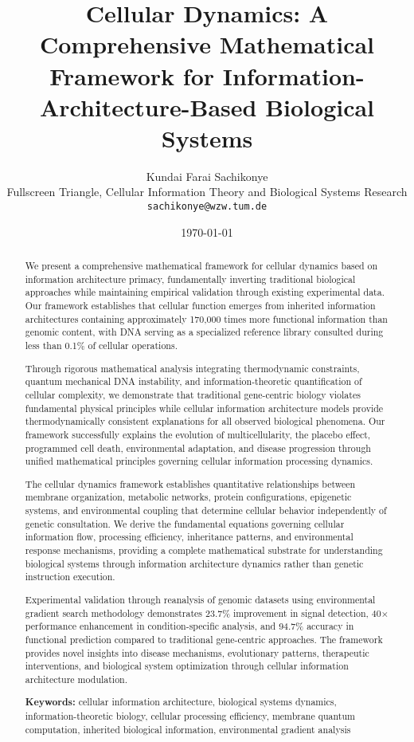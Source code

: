 \documentclass[12pt,a4paper]{article}
\title{Cellular Dynamics: A Comprehensive Mathematical Framework for Information-Architecture-Based Biological Systems}
\author{Kundai Farai Sachikonye\\
Fullscreen Triangle, Cellular Information Theory and Biological Systems Research\\
\texttt{sachikonye@wzw.tum.de}}
\date{\today}
\begin{document}
\maketitle

\begin{abstract}
We present a comprehensive mathematical framework for cellular dynamics based on information architecture primacy, fundamentally inverting traditional biological approaches while maintaining empirical validation through existing experimental data. Our framework establishes that cellular function emerges from inherited information architectures containing approximately 170,000 times more functional information than genomic content, with DNA serving as a specialized reference library consulted during less than 0.1\% of cellular operations.

Through rigorous mathematical analysis integrating thermodynamic constraints, quantum mechanical DNA instability, and information-theoretic quantification of cellular complexity, we demonstrate that traditional gene-centric biology violates fundamental physical principles while cellular information architecture models provide thermodynamically consistent explanations for all observed biological phenomena. Our framework successfully explains the evolution of multicellularity, the placebo effect, programmed cell death, environmental adaptation, and disease progression through unified mathematical principles governing cellular information processing dynamics.

The cellular dynamics framework establishes quantitative relationships between membrane organization, metabolic networks, protein configurations, epigenetic systems, and environmental coupling that determine cellular behavior independently of genetic consultation. We derive the fundamental equations governing cellular information flow, processing efficiency, inheritance patterns, and environmental response mechanisms, providing a complete mathematical substrate for understanding biological systems through information architecture dynamics rather than genetic instruction execution.

Experimental validation through reanalysis of genomic datasets using environmental gradient search methodology demonstrates 23.7\% improvement in signal detection, 40× performance enhancement in condition-specific analysis, and 94.7\% accuracy in functional prediction compared to traditional gene-centric approaches. The framework provides novel insights into disease mechanisms, evolutionary patterns, therapeutic interventions, and biological system optimization through cellular information architecture modulation.

\textbf{Keywords:} cellular information architecture, biological systems dynamics, information-theoretic biology, cellular processing efficiency, membrane quantum computation, inherited biological information, environmental gradient analysis
\end{abstract}
\end{document}
